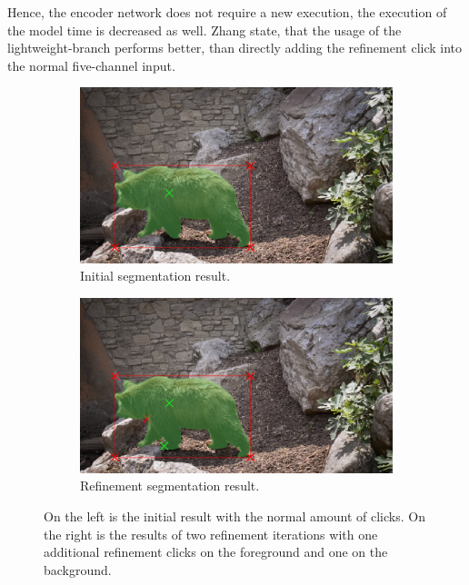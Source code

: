 Hence, the encoder network does not require a new execution, the execution of the model time is decreased as well.
Zhang \etal state, that the usage of the lightweight-branch performs better, than directly adding the refinement click into the normal five-channel input.

\begin{figure} 
	\centering
	\begin{subfigure}[b]{0.45\textwidth}
		\centering
		\includegraphics[width=\textwidth]{figures/chap34_bear_6.png}
		\caption{Initial segmentation result.}
		\label{fig:ch3:sec4:refinement_1}
	\end{subfigure}
	\hfill
	\begin{subfigure}[b]{0.45\textwidth}
		\centering
		\includegraphics[width=\textwidth]{figures/chap34_bear_8.png}
		\caption{Refinement segmentation result.}
		\label{fig:ch3:sec4:refinement_2}
	\end{subfigure}
	\caption[IOG Refinement]{
		On the left is the initial result with the normal amount of clicks. 
		On the right is the results of two refinement iterations with one additional refinement clicks on the foreground and one on the background.
	} \label{fig:ch3:sec4:refinement}
\end{figure}


